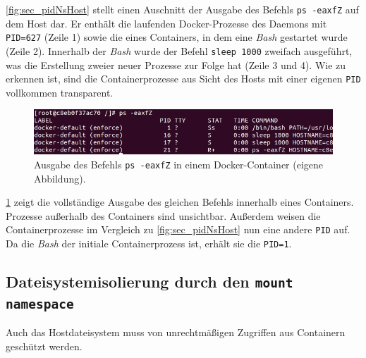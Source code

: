 \documentclass[../main.tex]{subfiles}
\begin{document}
			\fig \ref{fig:sec_pidNsHost} stellt einen Auschnitt der Ausgabe des Befehls \texttt{ps -eaxfZ} auf dem Host dar. Er enthält die laufenden Docker-Prozesse des Daemons mit \texttt{PID=627} (Zeile 1) sowie die eines Containers, in dem eine \emph{Bash} gestartet wurde (Zeile 2). Innerhalb der \emph{Bash} wurde der Befehl \texttt{sleep 1000} zweifach ausgeführt, was die Erstellung zweier neuer Prozesse zur Folge hat (Zeile 3 und 4). Wie zu erkennen ist, sind die Containerprozesse aus Sicht des Hosts mit einer eigenen \texttt{PID} vollkommen transparent.

			\begin{figure}[h]
					\centering
					\includegraphics[width=1.0\textwidth]{./images/sec_pidNsContainer.jpg}
					\caption{Ausgabe des Befehls \texttt{ps -eaxfZ} in einem Docker-Container (eigene Abbildung).}
					\label{fig:sec_pidNsContainer}
			\end{figure}

			\fig \ref{fig:sec_pidNsContainer} zeigt die vollständige Ausgabe des gleichen Befehls innerhalb eines Containers. Prozesse außerhalb des Containers sind unsichtbar. Außerdem weisen die Containerprozesse im Vergleich zu \fig \ref{fig:sec_pidNsHost} nun eine andere \texttt{PID} auf. Da die \emph{Bash} der initiale Containerprozess ist, erhält sie die \texttt{PID=1}.






    \subsection{Dateisystemisolierung durch den \texttt{mount namespace}}
			Auch das Hostdateisystem muss von unrechtmäßigen Zugriffen aus Containern geschützt werden.
\end{document}
